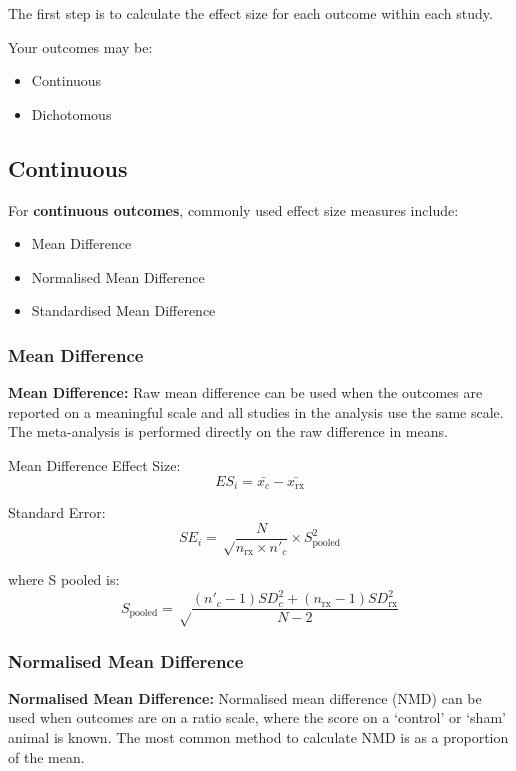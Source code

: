 \documentclass[
]{book}
\begin{document}
The first step is to calculate the effect size for each outcome within each study.

Your outcomes may be:

\begin{itemize}
\item
  Continuous
\item
  Dichotomous
\end{itemize}

\hypertarget{continuous}{%
\subsection{Continuous}\label{continuous}}

For \textbf{continuous outcomes}, commonly used effect size measures include:

\begin{itemize}
\item
  Mean Difference
\item
  Normalised Mean Difference
\item
  Standardised Mean Difference
\end{itemize}

\hypertarget{mean-difference}{%
\subsubsection{Mean Difference}\label{mean-difference}}

\textbf{Mean Difference:} Raw mean difference can be used when the outcomes are reported on a meaningful scale and all studies in the analysis use the same scale. The meta-analysis is performed directly on the raw difference in means.

Mean Difference Effect Size:
\[ ES_i = \bar{x_c} - \bar{x_\text{rx}}\]

Standard Error:
\[ SE_i = \sqrt \frac {N}{n_{\text{rx}} \times n'_c} \times S_{\text{pooled}}^2 \]

where S pooled is:
\[S_{\text{pooled}} = \sqrt \frac {(n'_c - 1)SD_c^2 + (n_{\text{rx}} - 1)SD_{\text{rx}}^2}{N -2} \]

\hypertarget{normalised-mean-difference}{%
\subsubsection{Normalised Mean Difference}\label{normalised-mean-difference}}

\textbf{Normalised Mean Difference:} Normalised mean difference (NMD) can be used when outcomes are on a ratio scale, where the score on a `control' or `sham' animal is known. The most common method to calculate NMD is as a proportion of the mean.
\end{document}
